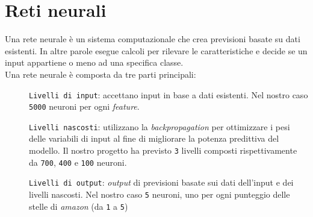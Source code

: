 		\section{Reti neurali}
			Una rete neurale è un sistema computazionale che crea previsioni basate su dati esistenti. In altre parole esegue calcoli per rilevare le caratteristiche e decide se un input appartiene o meno ad una specifica classe.\\			
			Una rete neurale è composta da tre parti principali:
			\begin{description}
				\item[] \texttt{Livelli di input}: accettano input in base a dati esistenti. Nel nostro caso \verb|5000| neuroni per ogni \textit{feature}.
				\item[] \texttt{Livelli nascosti}: utilizzano la \textit{backpropagation} per ottimizzare i pesi delle variabili di input al fine di migliorare la potenza predittiva del modello. Il nostro progetto ha previsto \verb|3| livelli composti rispettivamente da \verb|700|, \verb|400| e \verb|100| neuroni.
				\item[] \texttt{Livelli di output}: \textit{output} di previsioni basate sui dati dell'input e dei livelli nascosti. Nel nostro caso \verb|5| neuroni, uno per ogni punteggio delle stelle di \textit{amazon} (da \verb|1| a \verb|5|)
			\end{description}
		
